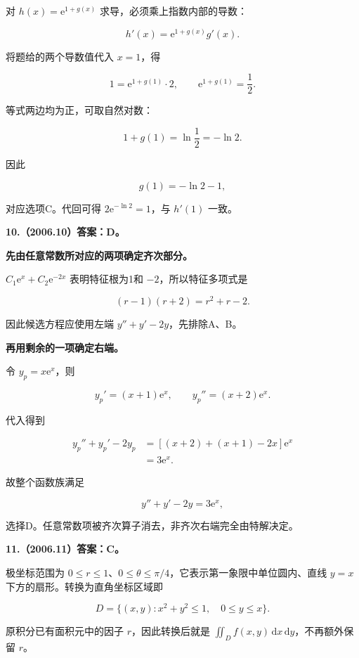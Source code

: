 \documentclass[UTF8,11pt,fontset=windows]{ctexart}
\begin{document}
对 $h(x)=\mathrm e^{1+g(x)}$ 求导，必须乘上指数内部的导数：

$$
h'(x)=\mathrm e^{1+g(x)}g'(x).
$$

将题给的两个导数值代入 $x=1$，得

$$
1=\mathrm e^{1+g(1)}\cdot2,
\qquad
\mathrm e^{1+g(1)}=\frac12.
$$

等式两边均为正，可取自然对数：

$$
1+g(1)=\ln\frac12=-\ln2.
$$

因此

$$
\boxed{g(1)=-\ln2-1,}
$$

对应选项C。代回可得 $2\mathrm e^{-\ln2}=1$，与 $h'(1)$ 一致。

\clearpage

\textbf{10.（2006.10）答案：D。}

\textbf{先由任意常数所对应的两项确定齐次部分。}

$C_1\mathrm e^x+C_2\mathrm e^{-2x}$ 表明特征根为1和 $-2$，所以特征多项式是

$$
(r-1)(r+2)=r^2+r-2.
$$

因此候选方程应使用左端 $y''+y'-2y$，先排除A、B。

\textbf{再用剩余的一项确定右端。}

令 $y_p=x\mathrm e^x$，则

$$
y_p'=(x+1)\mathrm e^x,
\qquad
y_p''=(x+2)\mathrm e^x.
$$

代入得到

$$
\begin{aligned}
y_p''+y_p'-2y_p
&=[(x+2)+(x+1)-2x]\mathrm e^x\\
&=3\mathrm e^x.
\end{aligned}
$$

故整个函数族满足

$$
\boxed{y''+y'-2y=3\mathrm e^x,}
$$

选择D。任意常数项被齐次算子消去，非齐次右端完全由特解决定。

\clearpage

\textbf{11.（2006.11）答案：C。}

极坐标范围为 $0\le r\le1$、$0\le\theta\le\pi/4$，它表示第一象限中单位圆内、直线 $y=x$ 下方的扇形。转换为直角坐标区域即

$$
D=\{(x,y):x^2+y^2\le1,\quad0\le y\le x\}.
$$

原积分已有面积元中的因子 $r$，因此转换后就是 $\iint_D f(x,y)\,\mathrm dx\,\mathrm dy$，不再额外保留 $r$。
\end{document}
